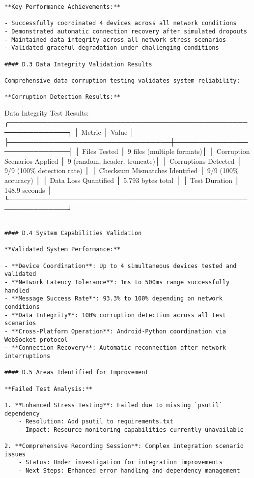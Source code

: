 \documentclass[12pt,a4paper]{report}
\begin{document}
{{\begin{verbatim}
**Key Performance Achievements:**

- Successfully coordinated 4 devices across all network conditions
- Demonstrated automatic connection recovery after simulated dropouts
- Maintained data integrity across all network stress scenarios
- Validated graceful degradation under challenging conditions

#### D.3 Data Integrity Validation Results

Comprehensive data corruption testing validates system reliability:

**Corruption Detection Results:**

\end{verbatim}
Data Integrity Test Results:
╭──────────────────────────────────────────────────────────────╮
│ Metric                          │ Value                      │
├─────────────────────────────────┼────────────────────────────┤
│ Files Tested                    │ 9 files (multiple formats)│
│ Corruption Scenarios Applied    │ 9 (random, header, truncate)│
│ Corruptions Detected           │ 9/9 (100\% detection rate) │
│ Checksum Mismatches Identified │ 9/9 (100\% accuracy)       │
│ Data Loss Quantified           │ 5,793 bytes total          │
│ Test Duration                   │ 148.9 seconds             │
╰──────────────────────────────────────────────────────────────╯
\begin{verbatim}

#### D.4 System Capabilities Validation

**Validated System Performance:**

- **Device Coordination**: Up to 4 simultaneous devices tested and validated
- **Network Latency Tolerance**: 1ms to 500ms range successfully handled
- **Message Success Rate**: 93.3% to 100% depending on network conditions
- **Data Integrity**: 100% corruption detection across all test scenarios
- **Cross-Platform Operation**: Android-Python coordination via WebSocket protocol
- **Connection Recovery**: Automatic reconnection after network interruptions

#### D.5 Areas Identified for Improvement

**Failed Test Analysis:**

1. **Enhanced Stress Testing**: Failed due to missing `psutil` dependency
    - Resolution: Add psutil to requirements.txt
    - Impact: Resource monitoring capabilities currently unavailable

2. **Comprehensive Recording Session**: Complex integration scenario issues
    - Status: Under investigation for integration improvements
    - Next Steps: Enhanced error handling and dependency management


\end{verbatim}}}
\end{document}
